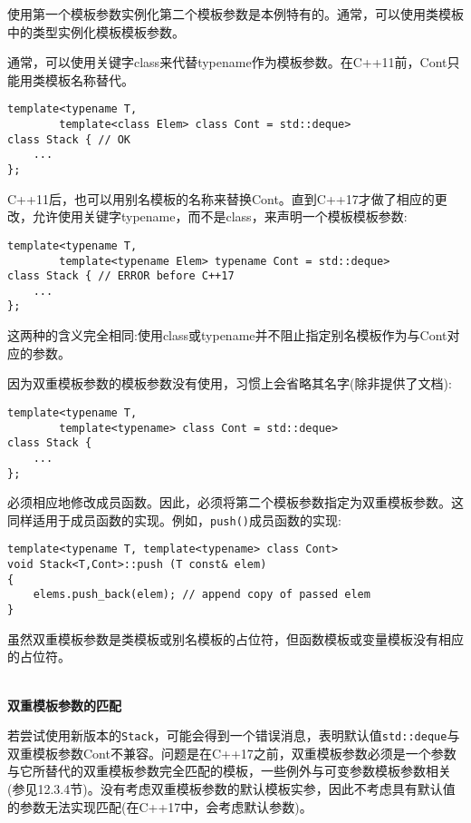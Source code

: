 使用第一个模板参数实例化第二个模板参数是本例特有的。通常，可以使用类模板中的类型实例化模板模板参数。

通常，可以使用关键字class来代替typename作为模板参数。在C++11前，Cont只能用类模板名称替代。

\begin{lstlisting}[style=styleCXX]
template<typename T,
		template<class Elem> class Cont = std::deque>
class Stack { // OK
	...
};
\end{lstlisting}

C++11后，也可以用别名模板的名称来替换Cont。直到C++17才做了相应的更改，允许使用关键字typename，而不是class，来声明一个模板模板参数:

\begin{lstlisting}[style=styleCXX]
template<typename T,
		template<typename Elem> typename Cont = std::deque>
class Stack { // ERROR before C++17
	...
};
\end{lstlisting}

这两种的含义完全相同:使用class或typename并不阻止指定别名模板作为与Cont对应的参数。

因为双重模板参数的模板参数没有使用，习惯上会省略其名字(除非提供了文档):

\begin{lstlisting}[style=styleCXX]
template<typename T,
		template<typename> class Cont = std::deque>
class Stack {
	...
};
\end{lstlisting}

必须相应地修改成员函数。因此，必须将第二个模板参数指定为双重模板参数。这同样适用于成员函数的实现。例如，\texttt{push()}成员函数的实现:

\begin{lstlisting}[style=styleCXX]
template<typename T, template<typename> class Cont>
void Stack<T,Cont>::push (T const& elem)
{
	elems.push_back(elem); // append copy of passed elem
}
\end{lstlisting}

虽然双重模板参数是类模板或别名模板的占位符，但函数模板或变量模板没有相应的占位符。

\hspace*{\fill} \\ %
\noindent
\textbf{双重模板参数的匹配}

若尝试使用新版本的\texttt{Stack}，可能会得到一个错误消息，表明默认值\texttt{std::deque}与双重模板参数Cont不兼容。问题是在C++17之前，双重模板参数必须是一个参数与它所替代的双重模板参数完全匹配的模板，一些例外与可变参数模板参数相关(参见12.3.4节)。没有考虑双重模板参数的默认模板实参，因此不考虑具有默认值的参数无法实现匹配(在C++17中，会考虑默认参数)。

